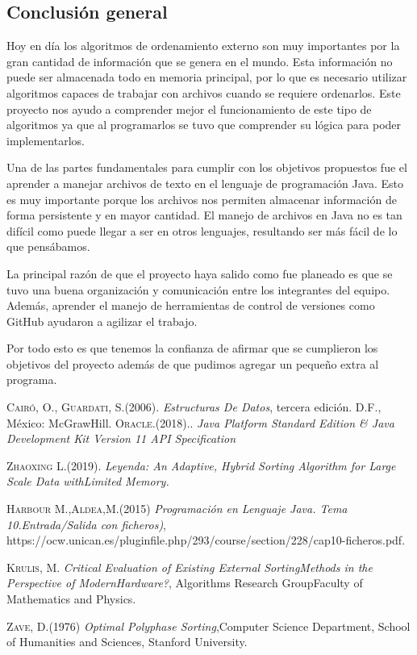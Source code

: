 \documentclass[11pt]{article}
\begin{document}
\subsection{Conclusión general}
Hoy en día los algoritmos de ordenamiento externo son muy importantes por la gran cantidad de información que se genera en el mundo. Esta información no puede ser almacenada todo en memoria principal, por lo que es necesario utilizar algoritmos capaces de trabajar con archivos cuando se requiere ordenarlos. Este proyecto nos ayudo a comprender mejor el funcionamiento de este tipo de algoritmos ya que al programarlos se tuvo que comprender su lógica para poder implementarlos.
\par
Una de las partes fundamentales para cumplir con los objetivos propuestos fue el aprender a manejar archivos de texto en el lenguaje de programación Java. Esto es muy importante porque los archivos nos permiten almacenar información de forma persistente y en mayor cantidad. El manejo de archivos en Java no es tan difícil como puede llegar a ser en otros lenguajes, resultando ser más fácil de lo que pensábamos.
\par
La principal razón de que el proyecto haya salido como fue planeado es que se tuvo una buena organización y comunicación entre los integrantes del equipo. Además, aprender el manejo de herramientas de control de versiones como GitHub ayudaron a agilizar el trabajo. 
\par
Por todo esto es que tenemos la confianza de afirmar que se cumplieron los objetivos del proyecto además de que pudimos agregar un pequeño extra al programa.


\begin{thebibliography}{x}
  \textsc{Cairó, O., Guardati, S.(2006).}
 \textit{Estructuras De Datos}, tercera edición. D.F., México: McGrawHill.
  \textsc{Oracle.(2018).}. \textit{Java Platform Standard Edition \& Java Development Kit Version 11 API Specification}
 
  \textsc{Zhaoxing L.(2019).}
 	\textit{Leyenda: An Adaptive, Hybrid Sorting Algorithm for Large Scale Data withLimited Memory.}	
 	
 	  \textsc{Harbour M.,Aldea,M.(2015) } 
 	\textit{Programación en Lenguaje Java. Tema 10.Entrada/Salida con ficheros)}, https://ocw.unican.es/pluginfile.php/293/course/section/228/cap10-ficheros.pdf. 	

  \textsc{Krulis, M.} 
 	\textit{Critical Evaluation of Existing External SortingMethods in the Perspective of ModernHardware?}, Algorithms Research GroupFaculty of Mathematics and Physics.   
 	
  \textsc{Zave, D.(1976)}
 \textit{Optimal Polyphase Sorting},Computer Science Department, School of Humanities and Sciences, Stanford University. 
 
\end{thebibliography}
\end{document}
